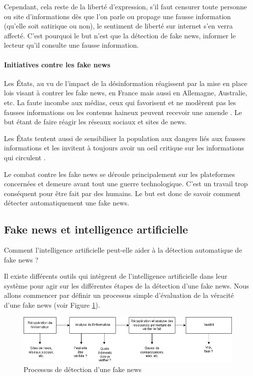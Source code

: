 Cependant, cela reste de la liberté d'expression, s'il faut censurer toute personne ou site d'informations dès que l'on parle ou propage une fausse information (qu'elle soit satirique ou non), le sentiment de liberté sur internet s'en verra affecté. C'est pourquoi le but n'est que la détection de fake news, informer le lecteur qu'il consulte une fausse information.

\paragraph{Initiatives contre les fake news}

Les États, au vu de l'impact de la désinformation réagissent par la mise en place lois visant à contrer les fake news, en France mais aussi en Allemagne, Australie, etc. La faute incombe aux médias, ceux qui favorisent et ne modèrent pas les fausses informations ou les contenus haineux peuvent recevoir une amende \cite{allemagne_fake_news}. Le but étant de faire réagir les réseaux sociaux et sites de news.

Les États tentent aussi de sensibiliser la population aux dangers liés aux fausses informations et les invitent à toujours avoir un oeil critique sur les informations qui circulent \cite{haciyakupoglu2018countering}.

Le combat contre les fake news se déroule principalement sur les plateformes concernées et demeure avant tout une guerre technologique. C'est un travail trop conséquent pour être fait par des humains. Le but est donc de savoir comment détecter automatiquement une fake news. 

\subsection{Fake news et intelligence artificielle}

Comment l'intelligence artificielle peut-elle aider à la détection automatique de fake news ? 

Il existe différents outils qui intègrent de l'intelligence artificielle dans leur système pour agir sur les différentes étapes de la détection d'une fake news. Nous allons commencer par définir un processus simple d'évaluation de la véracité d'une fake news (voir Figure \ref{fake_news_process}).

\begin{figure}[ht]
\centering
\includegraphics[width=\textwidth, draft=false]{diagrams/fake_news_process.png}
\caption{Processus de détection d'une fake news}
\label{fake_news_process}
\end{figure}


